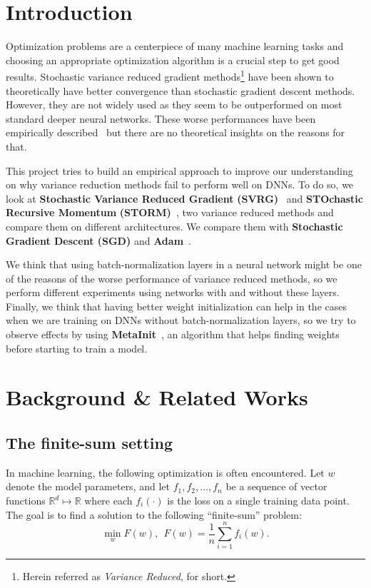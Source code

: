\documentclass[a4paper,11pt,oneside]{report}
\begin{document}
\maketoc

\chapter{Introduction}

Optimization problems are a centerpiece of many machine learning tasks and choosing an appropriate optimization algorithm is a crucial step to get good results. Stochastic variance reduced gradient methods\footnote{Herein referred as \textit{Variance Reduced},  for short.} have been shown to theoretically have better convergence than stochastic gradient descent methods. However, they are not widely used as they seem to be outperformed on most standard deeper neural networks.  
These worse performances have been empirically described~\citep{Defazio2019} but there are no theoretical insights on the reasons for that.  

This project tries to build an empirical approach to improve our understanding on why variance reduction methods fail to perform well on DNNs. To do so, we look at \textbf{Stochastic Variance Reduced Gradient} \textbf{(SVRG)}~\citep{johnson2013svrg} and \textbf{STOchastic Recursive Momentum} \textbf{(STORM)}~\citep{Cutkosky2019storm}, two variance reduced methods and compare them on different architectures. We compare them with \textbf{Stochastic Gradient Descent (SGD)} and \textbf{Adam}~\citep{kingma2014adam}.  

We think that using batch-normalization layers in a neural network might be one of the reasons of the worse performance of variance reduced methods, so we perform different experiments using networks with and without these layers. Finally, we think that having better weight initialization can help in the cases when we are training on DNNs without batch-normalization layers, so we try to observe effects by using \textbf{MetaInit}~\citep{NEURIPS2019_876e8108}, an algorithm that helps finding weights before starting to train a model.


\chapter{Background \& Related Works}

\section{The finite-sum setting}
In machine learning, the following optimization is often encountered.
Let $w$ denote the model parameters, and let $f_1, f_2, \dots, f_n$ be a sequence of vector functions $\mathbb{R}^d \mapsto \mathbb{R}$ where each $f_i(\cdot)$ is the loss on a single training data point.
The goal is to find a solution to the following ``finite-sum'' problem:
\begin{equation}\label{eq:minimzing_function}
    \min_w F(w),~~F(w)=\frac{1}{n}\sum_{i=1}^n f_i(w).
\end{equation}
\end{document}
